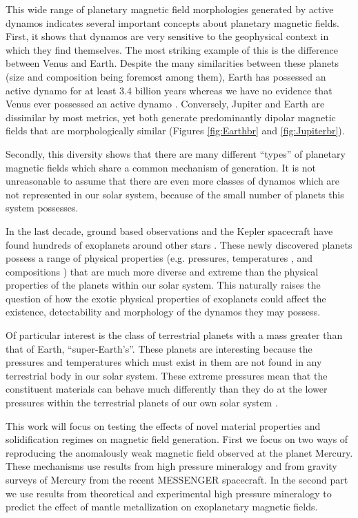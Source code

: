 This wide range of planetary magnetic field morphologies generated by active dynamos indicates several important concepts about planetary magnetic fields. First, it shows that dynamos are very sensitive to the geophysical context in which they find themselves. The most striking example of this is the difference between Venus and Earth. Despite the many similarities between these planets (size and composition being foremost among them), Earth has possessed an active dynamo for at least 3.4 billion years \citep{tarduno2010} whereas we have no evidence that Venus ever possessed an active dynamo \citep{russell1980}. Conversely, Jupiter and Earth are dissimilar by most metrics, yet both generate predominantly dipolar magnetic fields that are morphologically similar (Figures \ref{fig:Earthbr} and \ref{fig:Jupiterbr}). 

Secondly, this diversity shows that there are many different ``types'' of planetary magnetic fields which share a common mechanism of generation. It is not unreasonable to assume that there are even more classes of dynamos which are not represented in our solar system, because of the small number of planets this system possesses.

In the last decade, ground based observations and the Kepler spacecraft have found hundreds of exoplanets around other stars \citep{rein2015}. These newly discovered planets possess a range of physical properties (e.g. pressures, temperatures \citep{seager2007, valencia2006}, and  compositions \citep{elkins2008, elkins2008coreless}) that are much more diverse and extreme than the physical properties of the planets within our solar system. This naturally raises the question of how the exotic physical properties of exoplanets could affect the existence, detectability and morphology of the dynamos they may possess. 

Of particular interest is the class of terrestrial planets with a mass greater than that of Earth, ``super-Earth's''. These planets are interesting because the pressures and temperatures which must exist in them are not found in any terrestrial body in our solar system. These extreme pressures mean that the constituent materials can behave much differently than they do at the lower pressures within the terrestrial planets of our own solar system \citep{karato2011}. 

This work will focus on testing the effects of novel material properties and solidification regimes on magnetic field generation. First we focus on two ways of reproducing the anomalously weak magnetic field observed at the planet Mercury. These mechanisms use results from high pressure mineralogy and from gravity surveys of Mercury from the recent MESSENGER spacecraft. In the second part we use results from theoretical and experimental high pressure mineralogy to predict the effect of mantle metallization on exoplanetary magnetic fields. 